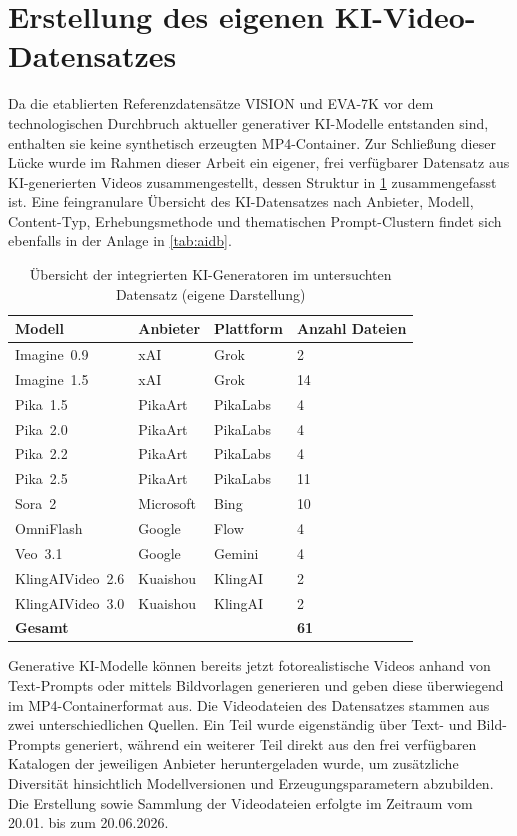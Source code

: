 \section{Erstellung des eigenen KI-Video-Datensatzes}
\label{sec:kidatensatz}

Da die etablierten Referenzdatensätze VISION und EVA-7K vor dem technologischen Durchbruch aktueller generativer KI-Modelle entstanden sind, enthalten sie keine synthetisch erzeugten MP4-Container. Zur Schließung dieser Lücke wurde im Rahmen dieser Arbeit ein eigener, frei verfügbarer Datensatz aus KI-generierten Videos zusammengestellt, dessen Struktur in \cref{tab:ki-modelle} zusammengefasst ist. Eine feingranulare Übersicht des KI-Datensatzes nach Anbieter, Modell, Content-Typ, Erhebungsmethode und thematischen Prompt-Clustern findet sich ebenfalls in der Anlage in \cref{tab:aidb}.

\begin{table}[htbp]
\centering
\begin{tabular}{llll}
\toprule
\textbf{Modell}  
& \textbf{Anbieter}& \textbf{Plattform}& \textbf{Anzahl Dateien} \\
\midrule
Imagine~0.9  
& xAI& Grok 
& 2 \\
Imagine~1.5  
& xAI& Grok 
& 14 \\
Pika~1.5  
& PikaArt& PikaLabs 
& 4 \\
Pika~2.0  
& PikaArt& PikaLabs 
& 4 \\
Pika~2.2  
& PikaArt& PikaLabs 
& 4 \\
Pika~2.5  
& PikaArt& PikaLabs 
& 11 \\
Sora~2  
& Microsoft& Bing& 10 \\
OmniFlash  
& Google& Flow& 4 \\
Veo~3.1  
& Google& Gemini& 4 \\
KlingAIVideo~2.6  
& Kuaishou& KlingAI 
& 2 \\
KlingAIVideo~3.0  & Kuaishou& KlingAI & 2 \\
\midrule
\multicolumn{2}{l}{\textbf{Gesamt}} & & \textbf{61} \\
\bottomrule
\end{tabular}
\caption{Übersicht der integrierten KI-Generatoren im untersuchten Datensatz (eigene Darstellung)}
\label{tab:ki-modelle}
\end{table}

Generative KI-Modelle können bereits jetzt fotorealistische Videos anhand von Text-Prompts oder mittels Bildvorlagen generieren und geben diese überwiegend im MP4-Containerformat aus. Die Videodateien des Datensatzes stammen aus zwei unterschiedlichen Quellen. Ein Teil wurde eigenständig über Text- und Bild-Prompts generiert, während ein weiterer Teil direkt aus den frei verfügbaren Katalogen der jeweiligen Anbieter heruntergeladen wurde, um zusätzliche Diversität hinsichtlich Modellversionen und Erzeugungsparametern abzubilden. Die Erstellung sowie Sammlung der Videodateien erfolgte im Zeitraum vom 20.01. bis zum 20.06.2026.

